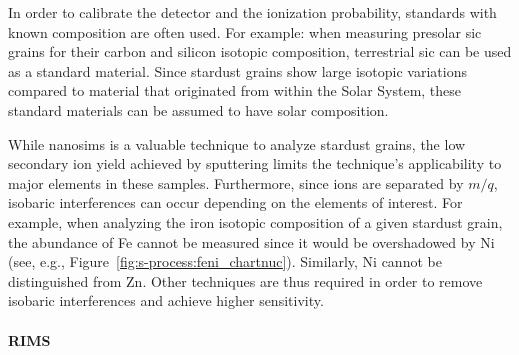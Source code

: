In order to calibrate the detector and the ionization probability, standards with known composition are often used. For example: when measuring presolar \ac{sic} grains for their carbon and silicon isotopic composition, terrestrial \ac{sic} can be used as a standard material. Since stardust grains show large isotopic variations compared to material that originated from within the Solar System, these standard materials can be assumed to have solar composition.

While \ac{nanosims} is a valuable technique to analyze stardust grains, the low secondary ion yield achieved by sputtering limits the technique's applicability to major elements in these samples. Furthermore, since ions are separated by $m/q$, isobaric interferences can occur depending on the elements of interest. For example, when analyzing the iron isotopic composition of a given stardust grain, the abundance of Fe cannot be measured since it would be overshadowed by Ni (see, e.g., Figure~\ref{fig:s-process:feni_chartnuc}). Similarly, Ni cannot be distinguished from Zn. Other techniques are thus required in order to remove isobaric interferences and achieve higher sensitivity. 


\paragraph{RIMS}

